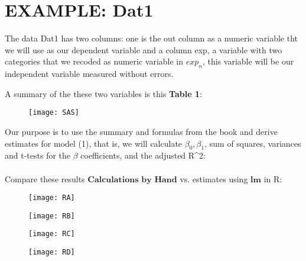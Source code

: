 \documentclass[letterpaper,11pt]{article}
\begin{document}
\section{EXAMPLE: Dat1}
	
	The data Dat1 has two columns: one is the out column as a numeric variable tht we will use as our dependent variable and a column 
	exp, a variable with two categories that we recoded as numeric variable in $exp_n$, this variable will be our independent variable 
	measured without errors.
	
	A summary of the these two variables is this \textbf{Table 1}:
	
		\begin{figure}[htbp]
		\centering
			\texttt{[image: SAS]}
	\end{figure}
	
\newpage
	
	Our purpose is to use the summary and formulas from the book and derive estimates for model (1), that is, we will calculate $\beta_{0}, 		
	\beta_{1}$, sum of squares, variances and t-tests for the $\beta$ coefficients, and the adjusted R^2:
	\\ \\
	Compare these results $\textbf{Calculations by Hand}$ vs. estimates using $\textbf{lm}$ in R:

	\begin{figure}[htbp]
		\centering
			\texttt{[image: RA]}
	\end{figure}
	
	\begin{figure}[htbp]
		\centering
			\texttt{[image: RB]}
	\end{figure}
	
	\begin{figure}[htbp]
		\centering
			\texttt{[image: RC]}
	\end{figure}
		
	\begin{figure}[htbp]
		\centering
			\texttt{[image: RD]}
	\end{figure}
			
\newpage


\end{document}
